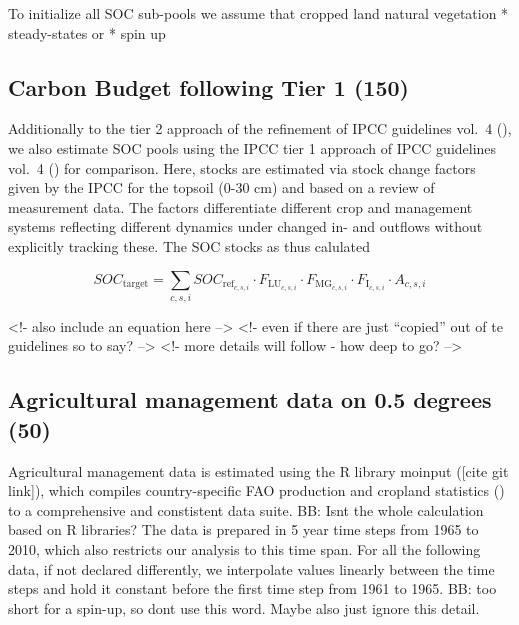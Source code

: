 \documentclass[gc, manuscript]{copernicus}
\begin{document}
To initialize all SOC sub-pools we assume that cropped land natural
vegetation * steady-states or * spin up

\newpage

\hypertarget{sec:tier1}{%
\subsection{Carbon Budget following Tier 1 (150)}\label{sec:tier1}}

Additionally to the tier 2 approach of the refinement of IPCC guidelines
vol.~4 (\citet{ipcc_2019_2019}), we also estimate SOC pools using the
IPCC tier 1 approach of IPCC guidelines vol.~4 (\citet{ipcc_2006_2006})
for comparison. Here, stocks are estimated via stock change factors
given by the IPCC for the topsoil (0-30 cm) and based on a review of
measurement data. The factors differentiate different crop and
management systems reflecting different dynamics under changed in- and
outflows without explicitly tracking these. The SOC stocks as thus
calulated

\begin{equation}
SOC_{\text{target}} = \sum_{c,s,i} SOC_{\text{ref}_{c,s,i}} \cdot F_{\text{LU}_{c,s,i}} \cdot F_{\text{MG}_{c,s,i}} \cdot F_{\text{I}_{c,s,i}} \cdot A_{c,s,i}
\label{eq:tier1}
\end{equation}

\textless!- also include an equation here --\textgreater{} \textless!-
even if there are just ``copied'' out of te guidelines so to say?
--\textgreater{} \textless!- more details will follow - how deep to go?
--\textgreater{}

\hypertarget{sec:agrimanagement}{%
\subsection{Agricultural management data on 0.5 degrees
(50)}\label{sec:agrimanagement}}

Agricultural management data is estimated using the R library moinput
({[}cite git link{]}), which compiles country-specific FAO production
and cropland statistics (\citep{FAOSTAT}) to a comprehensive and
constistent data suite. BB: Isnt the whole calculation based on R
libraries? The data is prepared in 5 year time steps from 1965 to 2010,
which also restricts our analysis to this time span. For all the
following data, if not declared differently, we interpolate values
linearly between the time steps and hold it constant before the first
time step from 1961 to 1965. BB: too short for a spin-up, so dont use
this word. Maybe also just ignore this detail.
\end{document}
